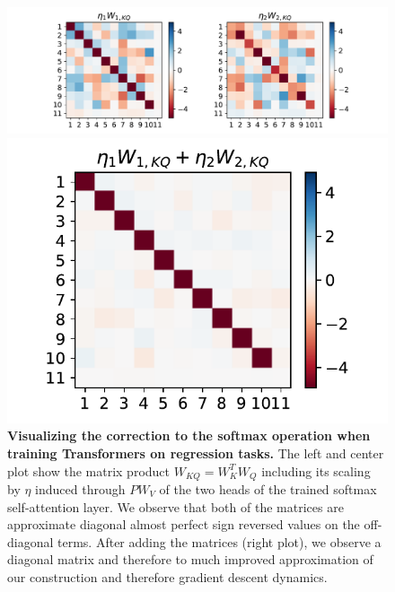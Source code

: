 \documentclass{article}
\theoremstyle{plain}
\theoremstyle{definition}
\theoremstyle{remark}
\begin{document}
\begin{figure}
\begin{center}
\begin{minipage}{.65\textwidth}
 \centering
  \begin{center}
    \includegraphics[width=1.\textwidth]{Final_figures/softmax_correction/weight_correction_vis1.pdf}
  \end{center}
\end{minipage}
  \hspace{-30pt}
\begin{minipage}{.32\textwidth}
  \centering
  \begin{center}
    \includegraphics[width=.9\textwidth]{Final_figures/softmax_correction/weight_correction_vis2.pdf}
  \end{center}
\end{minipage}
\end{center}
  \caption{\textbf{Visualizing the correction to the softmax operation when training Transformers on regression tasks.} The left and center plot show the matrix product $W_{KQ}=W_K^TW_Q$ including its scaling by $\eta$ induced through $PW_V$ of the two heads of the trained softmax self-attention layer. We observe that both of the matrices are approximate diagonal almost perfect sign reversed values on the off-diagonal terms. After adding the matrices (right plot), we observe a diagonal matrix and therefore to much improved approximation of our construction and therefore gradient descent dynamics.}
  \label{fig:softmax_weight_c}
  \vspace{-10pt}
\end{figure}
\end{document}
